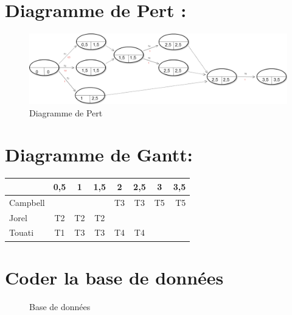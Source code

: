 \documentclass[a4paper,10pt]{report}
\begin{document}
	\section*{Diagramme de Pert :}
    \begin{figure}[!h]
        \centering
        \includegraphics[scale=0.28]{plan.png}
        \caption[Diagramme de Pert]{Diagramme de Pert}
    \end{figure}


\section*{Diagramme de Gantt:}

\begin{tabular}{|l|c|c|c|c|c|c|r|}
  \hline
   & 0,5 & 1 & 1,5 & 2 & 2,5 & 3 & 3,5\\
  \hline
  Campbell &  &  &  & T3 & T3 & T5 & T5 \\
  Jorel & T2 & T2 & T2 & & &  &  \\
  Touati & T1 & T3 & T3 & T4 & T4 & & \\
  \hline
\end{tabular}

\newpage

\section*{Coder la base de données}
	\begin{figure}[!h]
    \centering
    
    \caption[Base de données]{Base de données}
    \end{figure}
\end{document}
